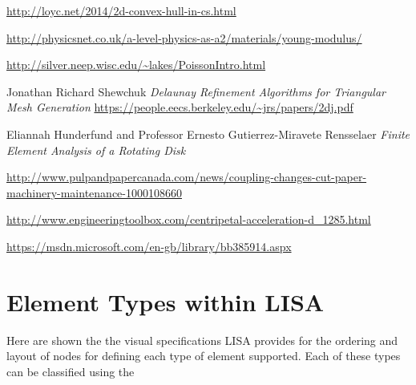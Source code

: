 \begin{changemargin}{\CMwidth}{\CMheight}
\begin{thebibliography}{9}
 \url{http://loyc.net/2014/2d-convex-hull-in-cs.html}

 \url{http://physicsnet.co.uk/a-level-physics-as-a2/materials/young-modulus/}

 \url{http://silver.neep.wisc.edu/~lakes/PoissonIntro.html}

 Jonathan Richard Shewchuk \emph{Delaunay Refinement Algorithms
for Triangular Mesh Generation} \url{https://people.eecs.berkeley.edu/~jrs/papers/2dj.pdf}

 Eliannah Hunderfund and Professor Ernesto Gutierrez-Miravete Rensselaer 
\emph{Finite Element Analysis of a Rotating Disk}


 \url{http://www.pulpandpapercanada.com/news/coupling-changes-cut-paper-machinery-maintenance-1000108660}

 \url{http://www.engineeringtoolbox.com/centripetal-acceleration-d_1285.html}

 \url{https://msdn.microsoft.com/en-gb/library/bb385914.aspx}


\end{thebibliography}
\end{changemargin}

\appendix

\section{Element Types within LISA}
Here are shown the the visual specifications LISA provides for the ordering and layout of nodes for defining each type of element supported. Each of these types can be classified using the

